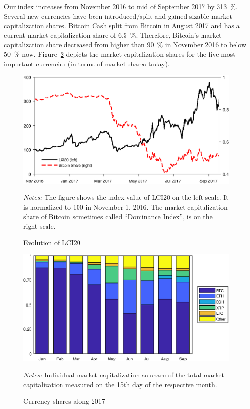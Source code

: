 \documentclass[11pt]{article}
\newcommand\fnotes[1]{\captionsetup{font=scriptsize}\caption*{\textsl{Notes:} #1}}
\begin{document}
Our index increases from November 2016 to mid of September 2017 by 313~\%.
Several new currencies have been introduced/split and gained sizable market capitalization shares.
Bitcoin Cash split from Bitcoin in August 2017 and has a current market capitalization share of 6.5~\%.
Therefore, Bitcoin's market capitalization share decreased from higher than 90~\% in November 2016 to below 50~\% now.
Figure~\ref{f:curshares} depicts the market capitalization shares for the five most important currencies (in terms of market shares today).

\begin{figure}[p]%
    \centering%
    \caption{Evolution of LCI20}\label{f:lci20}%
    \includegraphics[width=\textwidth]{figs/lci20.eps}%
    \medskip\newline%
    \fnotes{The figure shows the index value of LCI20 on the left scale. It is normalized to 100 in November 1, 2016. The market capitalization share of Bitcoin sometimes called ``Dominance Index'', is on the right scale.}
\end{figure}

\begin{figure}[p]%
    \centering%
    \caption{Currency shares along 2017}\label{f:curshares}%
    \includegraphics[width=\textwidth]{figs/currency_shares.eps}%
    \medskip\newline%
    \fnotes{Individual market capitalization as share of the total market capitalization measured on the 15th day of the respective month.}
\end{figure}
\end{document}
